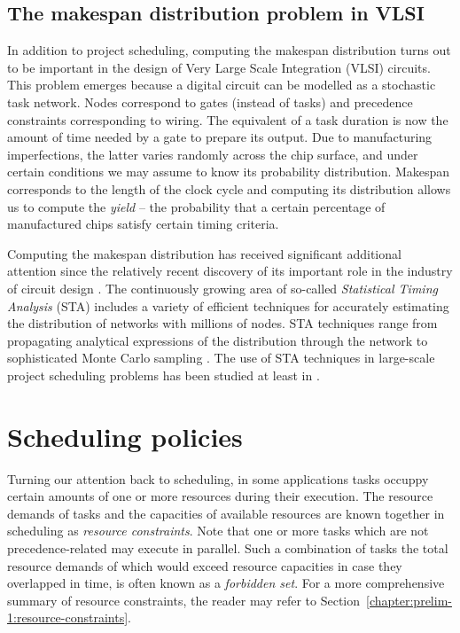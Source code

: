 	\subsection{The makespan distribution problem in VLSI}
	In addition to project scheduling, 
	computing the makespan distribution turns out to be important in the design of Very Large Scale Integration (VLSI) circuits.
	This problem emerges because a digital circuit can be modelled as a stochastic task network.
	Nodes correspond to gates (instead of tasks) and precedence constraints corresponding to wiring.
	The equivalent of a task duration is now the amount of time needed by a gate to prepare its output.
	Due to manufacturing imperfections, the latter varies randomly across the chip surface,
	and under certain conditions we may assume to know its probability distribution.
	Makespan corresponds to the length of the clock cycle and computing its distribution
	allows us to compute the \emph{yield} -- the probability that a certain percentage of manufactured chips satisfy certain timing criteria.

	Computing the makespan distribution has received significant additional attention
	since the relatively recent discovery of its important role in the industry of circuit design \cite{blaauw2008}.
	The continuously growing area of so-called \emph{Statistical Timing Analysis} (STA) includes
	a variety of efficient techniques for accurately estimating the distribution of networks with millions of nodes.
	STA techniques range from propagating analytical expressions of the distribution through the network \cite{visweswariah2006}
	to sophisticated Monte Carlo sampling \cite{veetil2011}.
	The use of STA techniques in large-scale project scheduling problems has been studied at least in \cite{mountakis2013}.

\section{Scheduling policies}
	Turning our attention back to scheduling,
	in some applications tasks occuppy certain amounts of one or more resources during their execution.
	The resource demands of tasks and the capacities of available resources are known together in scheduling as \emph{resource constraints}.
	Note that one or more tasks which are not precedence-related may execute in parallel.
	Such a combination of tasks the total resource demands of which would exceed resource capacities in case they overlapped in time, 
	is often known as a \emph{forbidden set}.
	For a more comprehensive summary of resource constraints,
	the reader may refer to Section~\ref{chapter:prelim-1:resource-constraints}.
	
